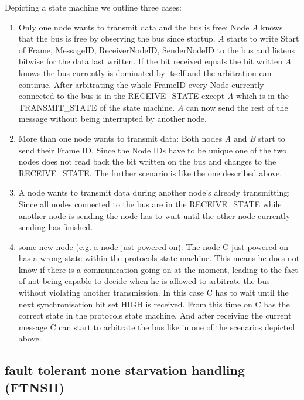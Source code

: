 Depicting a state machine we outline three cases:
\begin{enumerate}
 \item Only one node wants to transmit data and the bus is free: Node \textit{A} knows that the bus is free by 
observing the bus since startup. \textit{A} starts to write Start of Frame, MessageID, ReceiverNodeID, SenderNodeID  
to the bus and listens bitwise for the data last written.
       If the bit received equals the bit written \textit{A} knows the bus currently is dominated by itself and 
the arbitration can continue. After arbitrating the whole FrameID every Node currently connected to the bus is 
in the RECEIVE\_STATE except \textit{A} which is in the TRANSMIT\_STATE of the state machine.
       \textit{A} can now send the rest of the message without being interrupted by another node.

 \item More than one node wants to transmit data: Both nodes \textit{A} and \textit{B} start to send 
their Frame ID. Since the Node IDs have to be unique one of the two nodes does not read back the bit written on the bus and changes to the RECEIVE\_STATE. The further scenario is like the one described above.

 \item A node wants to transmit data during another node's already transmitting: Since all nodes connected to the bus are in the RECEIVE\_STATE while another node is sending the node has to wait until the other node currently sending has finished.

 \item some new node (e.g. a node just powered on): The node C just powered on has a wrong state within the protocols state machine. This means he does not know if there is a communication going on at the moment, leading to the fact of not being capable to decide when he is allowed to arbitrate the bus without violating another transmission.
       In this case C has to wait until the next synchronisation bit set HIGH is received. From this time on C has the correct state in the protocols state machine. And after receiving the current message C can start to arbitrate the bus like in one of the scenarios depicted above.
\end{enumerate}

\subsection{fault tolerant none starvation handling (FTNSH)}
\label{sec:bus:ftnsh}

